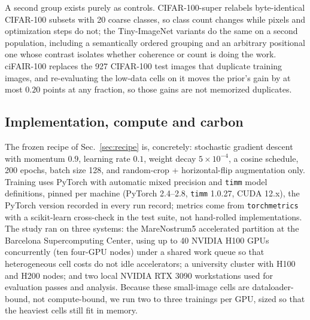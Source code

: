 A second group exists purely as controls. CIFAR-100-super relabels
byte-identical CIFAR-100 subsets with 20 coarse classes, so class count changes
while pixels and optimization steps do not; the Tiny-ImageNet variants do the
same on a second population, including a semantically ordered grouping and an
arbitrary positional one whose contrast isolates whether coherence or count is
doing the work. ciFAIR-100 \citep{barz2020cifair} replaces the 927 CIFAR-100
test images that duplicate training images, and re-evaluating the low-data cells on it moves the
prior's gain by at most $0.20$ points at any fraction, so those gains are not
memorized duplicates.

\subsection{Implementation, compute and carbon}\label{sec:compute}
The frozen recipe of Sec.~\ref{sec:recipe} is, concretely: stochastic
gradient descent with momentum $0.9$, learning rate $0.1$, weight decay
$5{\times}10^{-4}$, a cosine schedule, 200 epochs, batch size 128, and
random-crop + horizontal-flip augmentation only.
Training uses PyTorch with automatic mixed precision and \texttt{timm} model
definitions, pinned per machine (PyTorch 2.4--2.8, \texttt{timm} 1.0.27, CUDA
12.x), the PyTorch version recorded in every run record; metrics come from
\texttt{torchmetrics} with a scikit-learn cross-check in the test suite, not
hand-rolled implementations. The study ran on three systems: the MareNostrum5
accelerated partition at the Barcelona Supercomputing Center, using up to 40
NVIDIA H100 GPUs concurrently (ten four-GPU nodes) under a shared work queue so
that heterogeneous cell costs do not idle accelerators; a university cluster
with H100 and H200 nodes; and two local NVIDIA RTX 3090 workstations used for
evaluation passes and analysis. Because these small-image cells are
dataloader-bound, not compute-bound, we run two to three trainings per GPU,
sized so that the heaviest cells still fit in memory.

